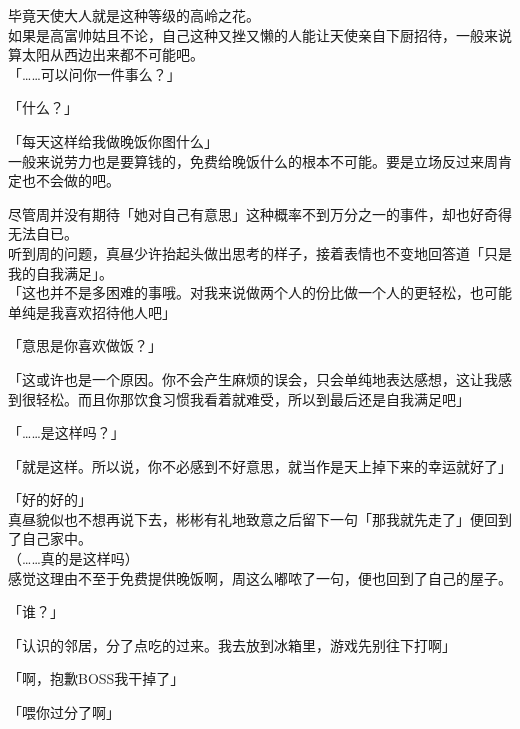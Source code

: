 毕竟天使大人就是这种等级的高岭之花。\\

如果是高富帅姑且不论，自己这种又挫又懒的人能让天使亲自下厨招待，一般来说算太阳从西边出来都不可能吧。\\

「……可以问你一件事么？」

「什么？」

「每天这样给我做晚饭你图什么」\\

一般来说劳力也是要算钱的，免费给晚饭什么的根本不可能。要是立场反过来周肯定也不会做的吧。

尽管周并没有期待「她对自己有意思」这种概率不到万分之一的事件，却也好奇得无法自已。\\

听到周的问题，真昼少许抬起头做出思考的样子，接着表情也不变地回答道「只是我的自我满足」。\\

「这也并不是多困难的事哦。对我来说做两个人的份比做一个人的更轻松，也可能单纯是我喜欢招待他人吧」

「意思是你喜欢做饭？」

「这或许也是一个原因。你不会产生麻烦的误会，只会单纯地表达感想，这让我感到很轻松。而且你那饮食习惯我看着就难受，所以到最后还是自我满足吧」

「……是这样吗？」

「就是这样。所以说，你不必感到不好意思，就当作是天上掉下来的幸运就好了」

「好的好的」\\

真昼貌似也不想再说下去，彬彬有礼地致意之后留下一句「那我就先走了」便回到了自己家中。\\

（……真的是这样吗）\\

感觉这理由不至于免费提供晚饭啊，周这么嘟哝了一句，便也回到了自己的屋子。\\

\vspace{2\baselineskip}

「谁？」

「认识的邻居，分了点吃的过来。我去放到冰箱里，游戏先别往下打啊」

「啊，抱歉BOSS我干掉了」

「喂你过分了啊」
